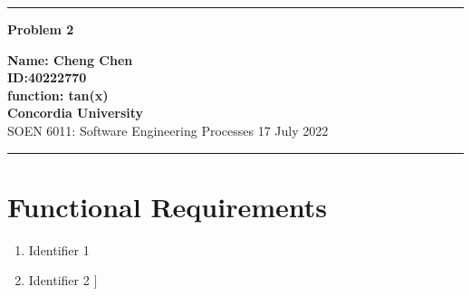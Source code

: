 \documentclass[10pt,a4paper,twoside]{article}
\begin{document}
\begin{center}
\hrule

\vspace{.4cm}
{\bf {\Huge Problem 2}}
\vspace{.2cm}
\end{center}
{\bf Name: Cheng Chen}  \\
{\bf ID:40222770}\\
{\bf function: tan(x)}\\
{\bf Concordia University}\\
SOEN 6011: Software Engineering Processes {\bf  } \hspace{\fill}  17 July  2022 \\
\hrule







\section{Functional Requirements}

\begin{enumerate}
\item 
Identifier 1
\item
Identifier 2
]
\end{enumerate}

\end{document}
